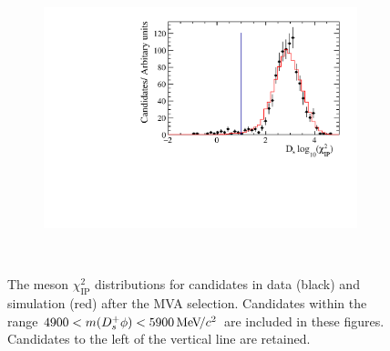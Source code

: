 \begin{figure}[!h]
\begin{subfigure}[t]{0.32\textwidth}
      \includegraphics[width=1.0\textwidth]{figs/Selection/Data_MC_Comparison_Var_2_B2DsPhi_Ds2KPiPi.pdf}
      \caption{\decay{\Dsp}{\Kp\pim\pip}}
   \end{subfigure}\\
   \caption{The \Bp meson $\chi^{2}_{\text{IP}}$ distributions for \decay{\Bp}{\Dsp\phiz} candidates in data (black) and simulation (red) after the MVA selection. Candidates within the range $4900 < m({{D}^+_{s}}\phi) < 5900 {\mathrm{\,Me\kern -0.1em V\!/}c^2}$ are included in these figures. Candidates to the left of the vertical line are retained.}
   \label{fig:ipchi2dist_signal_B}   
\end{figure}

